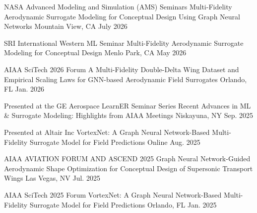 
\begin{cventries}


\cvsmallentries
    {NASA Advanced Modeling and Simulation (AMS) Seminars} %
    {Multi-Fidelity Aerodynamic Surrogate Modeling for Conceptual Design Using Graph Neural Networks} %
    {Mountain View, CA} %
    {July 2026} %
    {
    }


\cvsmallentries
    {SRI International Western ML Seminar} %
    {Multi-Fidelity Aerodynamic Surrogate Modeling for Conceptual Design} %
    {Menlo Park, CA} %
    {May 2026} %
    {
    }


\cvsmallentries
    {AIAA SciTech 2026 Forum} %
    {A Multi-Fidelity Double-Delta Wing Dataset and Empirical Scaling Laws for GNN-based Aerodynamic Field Surrogates} %
    {Orlando, FL} %
    {Jan. 2026} %
    {
    }

\cvsmallentries
    {Presented at the GE Aerospace LearnER Seminar Series} %
    {Recent Advances in ML \& Surrogate Modeling: Highlights from AIAA Meetings} %
    {Niskayuna, NY} %
    {Sep. 2025} %
    {
    }

\cvsmallentries
    {Presented at Altair Inc} %
    {VortexNet: A Graph Neural Network-Based Multi-Fidelity Surrogate Model for Field Predictions} %
    {Online} %
    {Aug. 2025} %
    {
    }

\cvsmallentries
    {AIAA AVIATION FORUM AND ASCEND 2025} %
    {Graph Neural Network-Guided Aerodynamic Shape Optimization for Conceptual Design of Supersonic Transport Wings} %
    {Las Vegas, NV} %
    {Jul. 2025} %
    {
    }

\cvsmallentries
    {AIAA SciTech 2025 Forum} %
    {VortexNet: A Graph Neural Network-Based Multi-Fidelity Surrogate Model for Field Predictions} %
    {Orlando, FL} %
    {Jan. 2025} %
    {
    }



\end{cventries}
